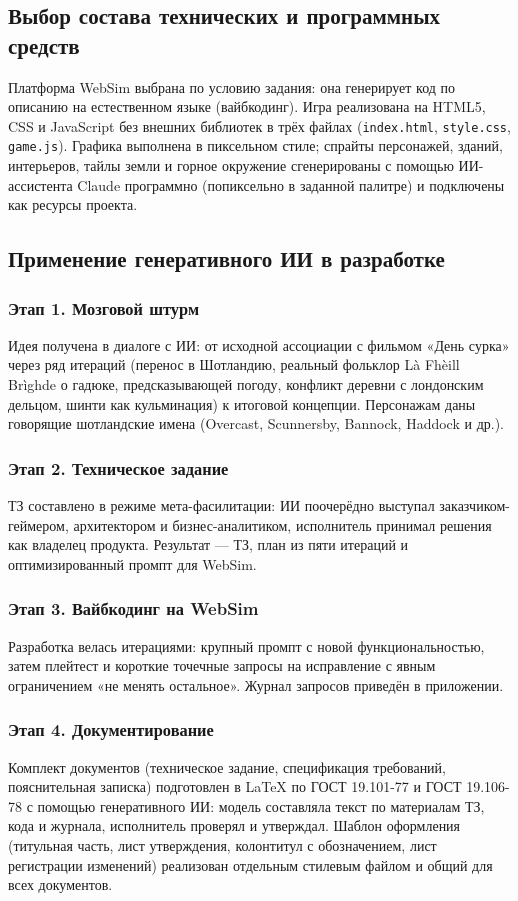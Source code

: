 \documentclass[12pt]{article}
\begin{document}
\subsection{Выбор состава технических и программных средств}
Платформа WebSim выбрана по условию задания: она генерирует код по описанию на естественном языке (вайбкодинг). Игра реализована на HTML5, CSS и JavaScript без внешних библиотек в трёх файлах (\texttt{index.html}, \texttt{style.css}, \texttt{game.js}). Графика выполнена в пиксельном стиле; спрайты персонажей, зданий, интерьеров, тайлы земли и горное окружение сгенерированы с помощью ИИ-ассистента Claude программно (попиксельно в заданной палитре) и подключены как ресурсы проекта.

\subsection{Применение генеративного ИИ в разработке}
\subsubsection{Этап 1. Мозговой штурм}
Идея получена в диалоге с ИИ: от исходной ассоциации с фильмом «День сурка» через ряд итераций (перенос в Шотландию, реальный фольклор Là Fhèill Brìghde о гадюке, предсказывающей погоду, конфликт деревни с лондонским дельцом, шинти как кульминация) к итоговой концепции. Персонажам даны говорящие шотландские имена (Overcast, Scunnersby, Bannock, Haddock и др.).
\subsubsection{Этап 2. Техническое задание}
ТЗ составлено в режиме мета-фасилитации: ИИ поочерёдно выступал заказчиком-геймером, архитектором и бизнес-аналитиком, исполнитель принимал решения как владелец продукта. Результат — ТЗ, план из пяти итераций и оптимизированный промпт для WebSim.
\subsubsection{Этап 3. Вайбкодинг на WebSim}
Разработка велась итерациями: крупный промпт с новой функциональностью, затем плейтест и короткие точечные запросы на исправление с явным ограничением «не менять остальное». Журнал запросов приведён в приложении.

\subsubsection{Этап 4. Документирование}
Комплект документов (техническое задание, спецификация требований, пояснительная записка) подготовлен в \LaTeX{} по ГОСТ 19.101-77 и ГОСТ 19.106-78 с помощью генеративного ИИ: модель составляла текст по материалам ТЗ, кода и журнала, исполнитель проверял и утверждал. Шаблон оформления (титульная часть, лист утверждения, колонтитул с обозначением, лист регистрации изменений) реализован отдельным стилевым файлом и общий для всех документов.
\end{document}
